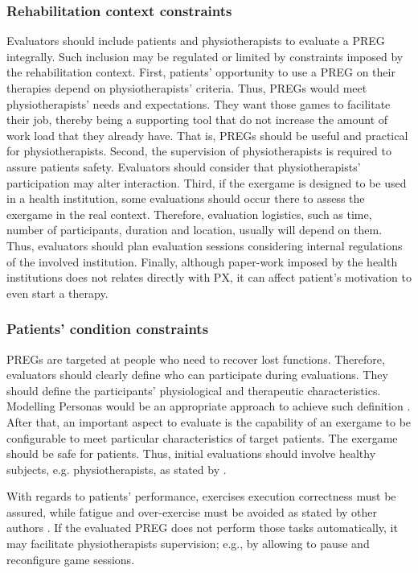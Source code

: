 \subsubsection{Rehabilitation context constraints}
\label{sec:reh_context_constraints}
Evaluators should include patients and physiotherapists to evaluate a \ac{PREG} integrally. Such inclusion may be regulated or limited by constraints imposed by the rehabilitation context. First, patients' opportunity to use a \ac{PREG} on their therapies depend on physiotherapists' criteria. Thus, \acp{PREG} would meet physiotherapists' needs and expectations. They want those games to facilitate their job, thereby being a supporting tool that do not increase the amount of work load that they already have. That is, \acp{PREG} should be useful and practical for physiotherapists. Second, the supervision of physiotherapists is required to assure patients safety. Evaluators should consider that physiotherapists’ participation may alter interaction. Third, if the exergame is designed to be used in a health institution, some evaluations should occur there to assess the exergame in the real context. Therefore, evaluation logistics, such as time, number of participants, duration and location, usually will depend on them. Thus, evaluators should plan evaluation sessions considering internal regulations of the involved institution. Finally, although paper-work imposed by the health institutions does not relates directly with \ac{PX}, it can affect patient's motivation to even start a therapy.

\subsubsection{Patients' condition constraints}
\label{sec:reh_patients_constraints}
\acp{PREG} are targeted at people who need to recover lost functions. Therefore, evaluators should clearly define who can participate during evaluations. They should define the participants' physiological and therapeutic characteristics. Modelling Personas would be an appropriate approach to achieve such definition \autocite{Mader2012}. After that, an important aspect to evaluate is the capability of an exergame to be configurable to meet particular characteristics of target patients. The exergame should be safe for patients. Thus, initial evaluations should involve healthy subjects, e.g. physiotherapists, as stated by \textcite{Chu2011}.

With regards to patients' performance, exercises execution correctness must be assured, while fatigue and over-exercise must be avoided as stated by other authors \autocite{Pasch2009,Isbister2015,Zhang2011}. If the evaluated \ac{PREG} does not perform those tasks automatically, it may facilitate physiotherapists supervision; e.g., by allowing to pause and reconfigure game sessions.

